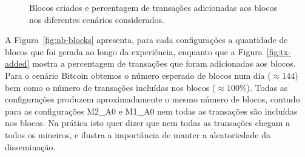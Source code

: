 \begin{figure}
\centering
{}
\caption{Blocos criados e percentagem de transações adicionadas aos blocos nos diferentes cenários considerados.}
\vspace{-0.7cm}
\end{figure}

A Figura~\ref{fig:nb-blocks} apresenta, para cada configurações a quantidade de blocos que foi gerada ao longo da experiência, enquanto que a Figura~\ref{fig:tx-added} mostra a percentagem de transações que foram adicionadas aos blocos.
Para o cenário Bitcoin obtemos o número esperado de blocos num dia ($\approx 144$) bem como o número de transações incluídas nos blocos ($\approx 100\%$).
Todas as configurações produzem aproximadamente o mesmo número de blocos, contudo para as configurações M2\_A0 e M1\_A0 nem todas as transações são incluídas nos blocos.
Na prática isto quer dizer que nem todas as transações chegam a todos os mineiros, e ilustra a importância de manter a aleatoriedade da disseminação.


